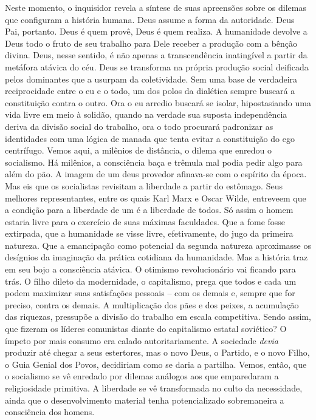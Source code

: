 Neste momento, o inquisidor revela a síntese de suas apreensões sobre os
dilemas que configuram a história humana. Deus assume a forma da
autoridade. Deus Pai, portanto. Deus é quem provê, Deus é quem realiza.
A humanidade devolve a Deus todo o fruto de seu trabalho para Dele
receber a produção com a bênção divina. Deus, nesse sentido, é não
apenas a transcendência inatingível a partir da metáfora atávica do céu.
Deus se transforma na própria produção social deificada pelos dominantes
que a usurpam da coletividade. Sem uma base de verdadeira reciprocidade
entre o eu e o todo, um dos polos da dialética sempre buscará a
constituição contra o outro. Ora o eu arredio buscará se isolar,
hipostasiando uma vida livre em meio à solidão, quando na verdade sua
suposta independência deriva da divisão social do trabalho, ora o todo
procurará padronizar as identidades com uma lógica de manada que tenta
evitar a constituição do ego centrífugo. Vemos aqui, a milênios de
distância, o dilema que enredou o socialismo. Há milênios, a consciência
baça e trêmula mal podia pedir algo para além do pão. A imagem de um
deus provedor afinava-se com o espírito da época. Mas eis que os
socialistas revisitam a liberdade a partir do estômago. Seus melhores
representantes, entre os quais Karl Marx e Oscar Wilde, entreveem que a
condição para a liberdade de um é a liberdade de todos. Só assim o homem
estaria livre para o exercício de suas máximas faculdades. Que a fome
fosse extirpada, que a humanidade se visse livre, efetivamente, do jugo
da primeira natureza. Que a emancipação como potencial da segunda
natureza aproximasse os desígnios da imaginação da prática cotidiana da
humanidade. Mas a história traz em seu bojo a consciência atávica. O
otimismo revolucionário vai ficando para trás. O filho dileto da
modernidade, o capitalismo, prega que todos e cada um podem maximizar
suas satisfações pessoais -- com os demais e, sempre que for preciso,
contra os demais. A multiplicação dos pães e dos peixes, a acumulação
das riquezas, pressupõe a divisão do trabalho em escala competitiva.
Sendo assim, que fizeram os líderes comunistas diante do capitalismo
estatal soviético? O ímpeto por mais consumo era calado
autoritariamente. A sociedade \emph{devia} produzir até chegar a seus
estertores, mas o novo Deus, o Partido, e o novo Filho, o Guia Genial
dos Povos, decidiriam como se daria a partilha. Vemos, então, que o
socialismo se vê enredado por dilemas análogos aos que emparedaram a
religiosidade primitiva. A liberdade se vê transformada no culto da
necessidade, ainda que o desenvolvimento material tenha potencializado
sobremaneira a consciência dos homens.

